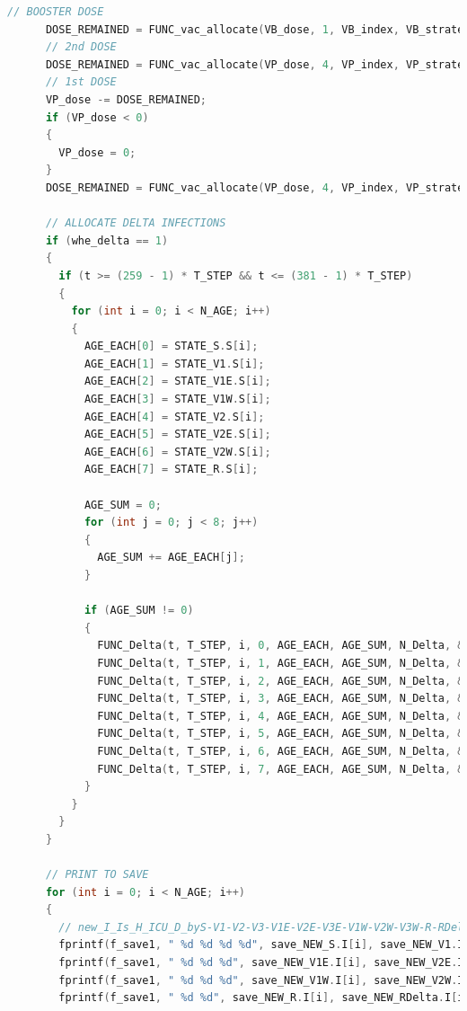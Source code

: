 \documentclass[bwprint]{gmcmthesis}
\numberwithin{figure}{section}
\begin{document}
\begin{lstlisting}[language=C]
      // BOOSTER DOSE
      DOSE_REMAINED = FUNC_vac_allocate(VB_dose, 1, VB_index, VB_strategy, &STATE_V2W, &STATE_V3, VB_admin);
      // 2nd DOSE
      DOSE_REMAINED = FUNC_vac_allocate(VP_dose, 4, VP_index, VP_strategy, &STATE_V1W, &STATE_V2, V2_admin);
      // 1st DOSE
      VP_dose -= DOSE_REMAINED;
      if (VP_dose < 0)
      {
        VP_dose = 0;
      }
      DOSE_REMAINED = FUNC_vac_allocate(VP_dose, 4, VP_index, VP_strategy, &STATE_S, &STATE_V1, V1_admin);

      // ALLOCATE DELTA INFECTIONS
      if (whe_delta == 1)
      {
        if (t >= (259 - 1) * T_STEP && t <= (381 - 1) * T_STEP)
        {
          for (int i = 0; i < N_AGE; i++)
          {
            AGE_EACH[0] = STATE_S.S[i];
            AGE_EACH[1] = STATE_V1.S[i];
            AGE_EACH[2] = STATE_V1E.S[i];
            AGE_EACH[3] = STATE_V1W.S[i];
            AGE_EACH[4] = STATE_V2.S[i];
            AGE_EACH[5] = STATE_V2E.S[i];
            AGE_EACH[6] = STATE_V2W.S[i];
            AGE_EACH[7] = STATE_R.S[i];

            AGE_SUM = 0;
            for (int j = 0; j < 8; j++)
            {
              AGE_SUM += AGE_EACH[j];
            }

            if (AGE_SUM != 0)
            {
              FUNC_Delta(t, T_STEP, i, 0, AGE_EACH, AGE_SUM, N_Delta, &STATE_S, &STATE_RDelta);
              FUNC_Delta(t, T_STEP, i, 1, AGE_EACH, AGE_SUM, N_Delta, &STATE_V1, &STATE_RDelta);
              FUNC_Delta(t, T_STEP, i, 2, AGE_EACH, AGE_SUM, N_Delta, &STATE_V1E, &STATE_RDelta);
              FUNC_Delta(t, T_STEP, i, 3, AGE_EACH, AGE_SUM, N_Delta, &STATE_V1W, &STATE_RDelta);
              FUNC_Delta(t, T_STEP, i, 4, AGE_EACH, AGE_SUM, N_Delta, &STATE_V2, &STATE_RDelta);
              FUNC_Delta(t, T_STEP, i, 5, AGE_EACH, AGE_SUM, N_Delta, &STATE_V2E, &STATE_RDelta);
              FUNC_Delta(t, T_STEP, i, 6, AGE_EACH, AGE_SUM, N_Delta, &STATE_V2W, &STATE_RDelta);
              FUNC_Delta(t, T_STEP, i, 7, AGE_EACH, AGE_SUM, N_Delta, &STATE_R, &STATE_RDelta);
            }
          }
        }
      }

      // PRINT TO SAVE
      for (int i = 0; i < N_AGE; i++)
      {
        // new_I_Is_H_ICU_D_byS-V1-V2-V3-V1E-V2E-V3E-V1W-V2W-V3W-R-RDelta
        fprintf(f_save1, " %d %d %d %d", save_NEW_S.I[i], save_NEW_V1.I[i], save_NEW_V2.I[i], save_NEW_V3.I[i]);
        fprintf(f_save1, " %d %d %d", save_NEW_V1E.I[i], save_NEW_V2E.I[i], save_NEW_V3E.I[i]);
        fprintf(f_save1, " %d %d %d", save_NEW_V1W.I[i], save_NEW_V2W.I[i], save_NEW_V3W.I[i]);
        fprintf(f_save1, " %d %d", save_NEW_R.I[i], save_NEW_RDelta.I[i]);


\end{lstlisting}
\end{document}
